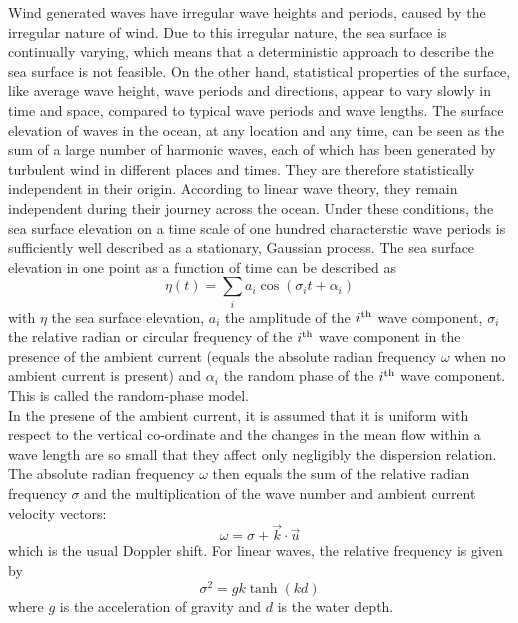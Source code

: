\documentclass[12pt]{book}
\begin{document}
Wind generated waves have irregular wave heights and periods, caused by the irregular
nature of wind. Due to this irregular nature, the sea surface is continually varying,
which means that a deterministic approach to describe the sea surface is not feasible.
On the other hand, statistical properties of the surface, like average wave
height, wave periods and directions, appear to vary slowly in time and space, compared
to typical wave periods and wave lengths.
The surface elevation of waves in the ocean, at any location and any time,
can be seen as the sum of a large number of harmonic waves, each of which has been
generated by turbulent wind in different places and times. They are therefore
statistically independent in their origin. According to linear wave theory, they remain
independent during their journey across the ocean. Under these conditions, the sea
surface elevation on a time scale of one hundred characterstic wave periods is sufficiently
well described as a stationary, Gaussian process. The sea surface elevation in one point as
a function of time can be described as
\begin{equation}
  \eta (t) = \sum_i a_i \cos (\sigma_i t + {\alpha}_i)
  \label{intro1}
\end{equation}
with $\eta$ the sea surface elevation, $a_i$ the amplitude of the $i^{\rm th}$ wave component,
$\sigma_i$ the relative radian or circular frequency of the $i^{\rm th}$ wave component in the
presence of the ambient current (equals the absolute radian frequency $\omega$ when no ambient
current is present) and ${\alpha}_i$ the random phase of the $i^{\rm th}$ wave component.
This is called the random-phase model.
\\[2ex]
\noindent
In the presene of the ambient current, it is assumed that it is uniform with respect to the vertical
co-ordinate and the changes in the mean flow within a wave length are so small that they affect only
negligibly the dispersion relation. The absolute radian frequency $\omega$ then equals the sum of
the relative radian frequency $\sigma$ and the multiplication of the wave number and ambient current
velocity vectors:
\begin{equation}
  \omega = \sigma + \vec{k} \cdot \vec{u}
  \label{intro2}
\end{equation}
which is the usual Doppler shift. For linear waves, the relative frequency is given by
\begin{equation}
  \sigma^2 = gk \tanh (kd)
  \label{intro3}
\end{equation}
where $g$ is the acceleration of gravity and $d$ is the water depth.
\end{document}
